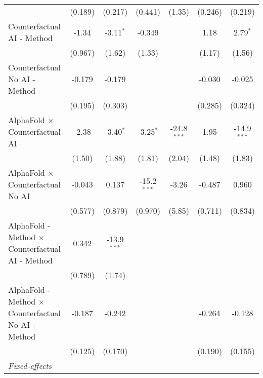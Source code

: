 \begin{tabular}{lcccccc}
                                                              & (0.189)      & (0.217)       & (0.441)       & (1.35)        & (0.246)      & (0.219)\\   
   Counterfactual AI - Method                                 & -1.34        & -3.11$^{*}$   & -0.349        &               & 1.18         & 2.79$^{*}$\\   
                                                              & (0.967)      & (1.62)        & (1.33)        &               & (1.17)       & (1.56)\\   
   Counterfactual No AI - Method                              & -0.179       & -0.179        &               &               & -0.030       & -0.025\\   
                                                              & (0.195)      & (0.303)       &               &               & (0.285)      & (0.324)\\   
   AlphaFold $\times$ Counterfactual AI                       & -2.38        & -3.40$^{*}$   & -3.25$^{*}$   & -24.8$^{***}$ & 1.95         & -14.9$^{***}$\\   
                                                              & (1.50)       & (1.88)        & (1.81)        & (2.04)        & (1.48)       & (1.83)\\   
   AlphaFold $\times$ Counterfactual No AI                    & -0.043       & 0.137         & -15.2$^{***}$ & -3.26         & -0.487       & 0.960\\   
                                                              & (0.577)      & (0.879)       & (0.970)       & (5.85)        & (0.711)      & (0.834)\\   
   AlphaFold - Method $\times$ Counterfactual AI - Method     & 0.342        & -13.9$^{***}$ &               &               &              &   \\   
                                                              & (0.789)      & (1.74)        &               &               &              &   \\   
   AlphaFold - Method $\times$ Counterfactual No AI - Method  & -0.187       & -0.242        &               &               & -0.264       & -0.128\\   
                                                              & (0.125)      & (0.170)       &               &               & (0.190)      & (0.155)\\   
   \midrule
   \emph{Fixed-effects}\\

\end{tabular}
